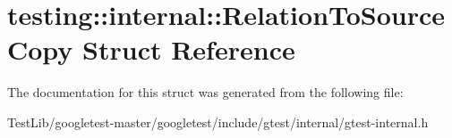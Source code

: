 \hypertarget{structtesting_1_1internal_1_1RelationToSourceCopy}{}\section{testing\+:\+:internal\+:\+:Relation\+To\+Source\+Copy Struct Reference}
\label{structtesting_1_1internal_1_1RelationToSourceCopy}


The documentation for this struct was generated from the following file\+:\begin{DoxyCompactItemize}
\item 
Test\+Lib/googletest-\/master/googletest/include/gtest/internal/gtest-\/internal.\+h\end{DoxyCompactItemize}

